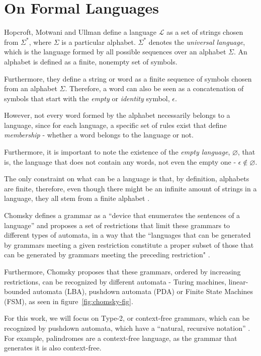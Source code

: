 \chapter{On Formal Languages} \label{chapter:2}
Hopcroft, Motwani and Ullman\cite{hopcroft-automata} define a language $\mathcal{L}$ as a set of strings chosen from $\Sigma^*$, where $\Sigma$ is a particular alphabet. $\Sigma^*$ denotes the \emph{universal language}, which is the language formed by all possible sequences over an alphabet $\Sigma$. An alphabet is defined as a finite, nonempty set of symbols. 

Furthermore, they define a string or word as a finite sequence of symbols chosen from an alphabet $\Sigma$. Therefore, a word can also be seen as a concatenation of symbols that start with the \emph{empty} or \emph{identity} symbol, $\epsilon$.

However, not every word formed by the alphabet necessarily belongs to a language, since for each language, a specific set of rules exist that define \emph{membership} - whether a word belongs to the language or not.

Furthermore, it is important to note the existence of the \emph{empty language}, $\varnothing$, that is, the language that does not contain any words, not even the empty one - $\epsilon \notin \varnothing$.

The only constraint on what can be a language is that, by definition, alphabets are finite, therefore, even though there might be an infinite amount of strings in a language, they all stem from a finite alphabet \cite{hopcroft-automata}.

Chomsky defines a grammar as a ``device that enumerates the sentences of a language'' and proposes a set of restrictions that limit these grammars to different types of automata, in a way that the ``languages that can be generated by grammars meeting a given restriction constitute a proper subset of those that can be generated by grammars meeting the preceding restriction" \cite{chomsky-hierarchy}. 

Furthermore, Chomsky proposes that these grammars, ordered by increasing restrictions, can be recognized by different automata - Turing machines, linear-bounded automata (LBA), pushdown automata (PDA) or Finite State Machines (FSM), as seen in figure~\ref{fig:chomsky-fig}.

For this work, we will focus on Type-2, or context-free grammars, which can be recognized by pushdown automata, which have a ``natural, recursive notation'' \cite{hopcroft-automata}. For example, palindromes are a context-free language, as the grammar that generates it is also context-free.

